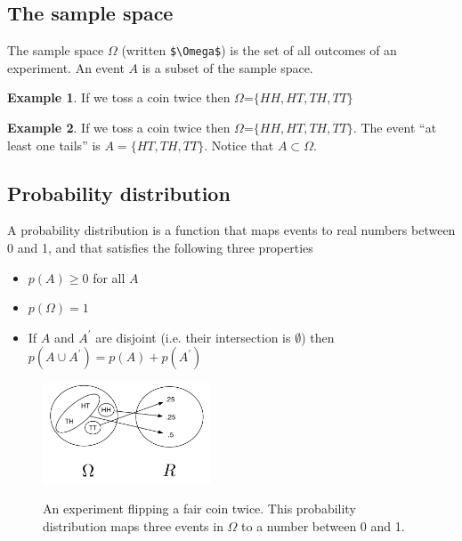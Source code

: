 \documentclass[]{article}
\theoremstyle{definition}
\newtheorem{exmp}{Example}[section]
\begin{document}
\subsection{The sample space}

The sample space $\Omega$  (written \verb|$\Omega$|) is the set of all outcomes of an experiment. An event $A$ is a subset of the sample space. 

\begin{exmp}
If we toss a coin twice then $\Omega$=$\{HH, HT, TH, TT\}$
\end{exmp}

\begin{exmp}
If we toss a coin twice then $\Omega$=$\{HH, HT, TH, TT\}.$ The event ``at least one tails'' is $A=\{HT, TH, TT\}$. Notice that $A \subset \Omega$.
\end{exmp}

\subsection{Probability distribution}

A probability distribution is a function that maps events to real numbers between 0 and 1, and that satisfies the following three properties

\begin{itemize}
\item $p(A) \geq 0$ for all $A$
\item $p(\Omega) = 1$
\item If $A$ and $A^\prime$ are disjoint (i.e. their intersection is $\emptyset$) then $p(A \cup A^{\prime}) =  p(A) + p(A^{\prime})$
\end{itemize}

\begin{figure}[h]
     \centering
    	{\includegraphics[width=5cm]{prob_distro}}
    \caption{An experiment flipping a fair coin twice. This probability distribution maps three events in $\Omega$ to a number between 0 and 1.}
     \label{steady_state}
\end{figure}
\end{document}
